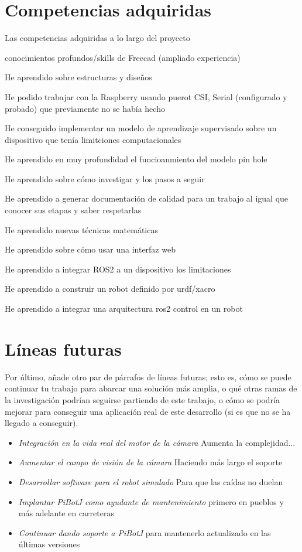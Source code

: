 
\section{Competencias adquiridas}

Las competencias adquiridas a lo largo del proyecto

conocimientos profundos/skills de Freecad (ampliado experiencia)

He aprendido sobre estructuras y diseños

He podido trabajar con la Raspberry usando puerot CSI, Serial (configurado y probado)  que previamente no se había hecho

He conseguido implementar un modelo de aprendizaje supervisado sobre un dispositivo que tenía limitciones computacionales

He aprendido en muy profundidad el funcioanmiento del modelo pin hole 

He aprendido sobre cómo investigar y los pasos a seguir 

He aprendido a generar documentación de calidad para un trabajo al igual que conocer sus etapas y saber respetarlas 

He aprendido nuevas técnicas matemáticas 

He aprendido sobre cómo usar una interfaz web 

He aprendido a integrar ROS2 a un dispositivo los limitaciones

He aprendido a construir un robot definido por urdf/xacro

He aprendido a integrar  una arquitectura ros2 control en un robot

\section{Líneas futuras}


Por último, añade otro par de párrafos de líneas futuras; esto es, cómo se puede continuar tu trabajo para abarcar una solución más amplia, o qué otras ramas de la investigación podrían seguirse partiendo de este trabajo, o cómo se podría mejorar para conseguir una aplicación real de este desarrollo (si es que no se ha llegado a conseguir).


\begin{itemize}
	\item \textit{Integración en la vida real del motor de la cámara} Aumenta la complejidad...
	\item \textit{Aumentar el campo de visión de la cámara} Haciendo más largo el soporte
	\item \textit{Desarrollar software para el robot simulado} Para que las caídas no duelan
	\item \textit{Implantar PiBotJ como ayudante de mantenimiento} primero en pueblos y más adelante en carreteras
	\item \textit{Continuar dando soporte a PiBotJ} para mantenerlo actualizado en las últimas versiones
\end{itemize}\

